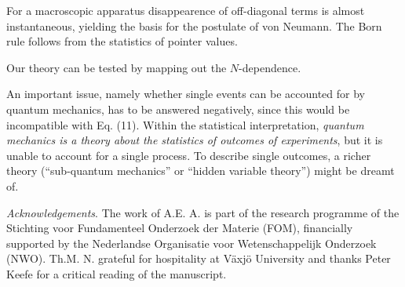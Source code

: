 \documentclass[aps,prb,floatfix,twocolumn]{revtex4}
\begin{document}
For a macroscopic apparatus disappearence of off-diagonal terms 
is almost instantaneous, yielding the basis for the postulate of von Neumann.
The Born rule follows from the statistics of pointer values.

Our theory can be tested by mapping out the $N$-dependence.



An important issue, namely whether single events can be accounted for by 
quantum mechanics, has to be answered negatively, since this would be incompatible 
with Eq. (11).  Within the statistical
interpretation, {\it quantum mechanics is a theory about the statistics of 
outcomes of experiments}, but it is unable to account for a single process. 
To describe single outcomes, a richer theory 
(``sub-quantum mechanics''  or ``hidden variable theory'') might be dreamt of.

{\it Acknowledgements}.
The work of A.E. A. is part of the research programme of the Stichting voor 
Fundamenteel Onderzoek der Materie (FOM), financially supported by 
the Nederlandse Organisatie voor Wetenschappelijk Onderzoek (NWO). 
Th.M. N. grateful for hospitality at V\"axj\"o University
and thanks Peter Keefe for a critical reading of the manuscript.
\end{document}
